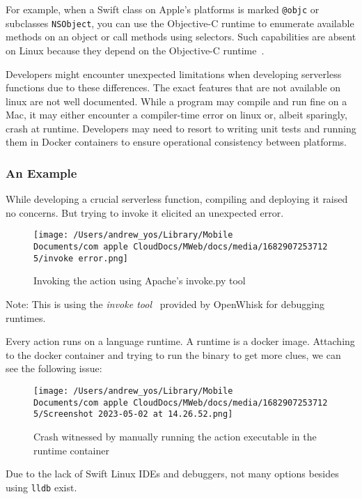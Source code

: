 For example, when a Swift class on Apple’s platforms is marked \texttt{@objc} or subclasses \texttt{NSObject}, you can use the Objective-C runtime to enumerate available methods on an object or call methods using selectors. Such capabilities are absent on Linux because they depend on the Objective-C runtime~\cite{swift-platform-support}.

Developers might encounter unexpected limitations when developing serverless functions due to these differences. The exact features that are not available on linux are not well documented. While a program may compile and run fine on a Mac, it may either encounter a compiler-time error on linux or, albeit sparingly, crash at runtime. Developers may need to resort to writing unit tests and running them in Docker containers to ensure operational consistency between platforms.

\subsubsection{An Example}

While developing a crucial serverless function, compiling and deploying it raised no concerns. But trying to invoke it elicited an unexpected error.

\begin{figure}[h]
    \centering
    \texttt{[image: /Users/andrew\_yos/Library/Mobile Documents/com~apple~CloudDocs/MWeb/docs/media/16829072537125/invoke error.png]}
    \caption{Invoking the action using Apache's invoke.py tool}
\end{figure}

\noindent Note: This is using the \textit{invoke tool}~\cite{openwhisk-invoke}
 provided by OpenWhisk for debugging runtimes.

Every action runs on a language runtime. A runtime is a docker image. Attaching to the docker container and trying to run the binary to get more clues, we can see the following issue:

\begin{figure}[h]
    \centering
    \texttt{[image: /Users/andrew\_yos/Library/Mobile Documents/com~apple~CloudDocs/MWeb/docs/media/16829072537125/Screenshot 2023-05-02 at 14.26.52.png]}
    \caption{Crash witnessed by manually running the action executable in the runtime container}
\end{figure}

Due to the lack of Swift Linux IDEs and debuggers, not many options besides using \texttt{lldb} exist.

